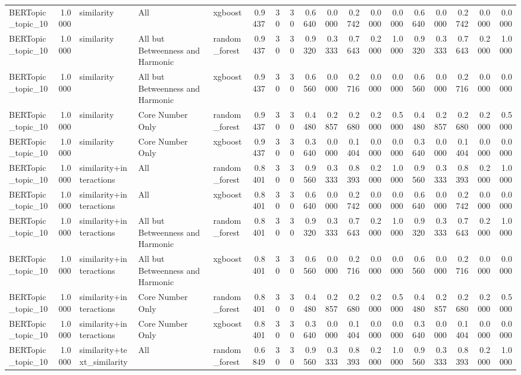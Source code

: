 \begin{tabular}{lrlllrrrrrrrrrrrrr}
BERTopic_topic_10 & 1.0000 & similarity & All & xgboost & 0.9437 & 30 & 30 & 0.6640 & 0.0000 & 0.2742 & 0.0000 & 0.0000 & 0.6640 & 0.0000 & 0.2742 & 0.0000 & 0.0000 \\
BERTopic_topic_10 & 1.0000 & similarity & All but Betweenness and Harmonic & random_forest & 0.9437 & 30 & 30 & 0.9320 & 0.3333 & 0.7643 & 0.2000 & 1.0000 & 0.9320 & 0.3333 & 0.7643 & 0.2000 & 1.0000 \\
BERTopic_topic_10 & 1.0000 & similarity & All but Betweenness and Harmonic & xgboost & 0.9437 & 30 & 30 & 0.6560 & 0.0000 & 0.2716 & 0.0000 & 0.0000 & 0.6560 & 0.0000 & 0.2716 & 0.0000 & 0.0000 \\
BERTopic_topic_10 & 1.0000 & similarity & Core Number Only & random_forest & 0.9437 & 30 & 30 & 0.4480 & 0.2857 & 0.2680 & 0.2000 & 0.5000 & 0.4480 & 0.2857 & 0.2680 & 0.2000 & 0.5000 \\
BERTopic_topic_10 & 1.0000 & similarity & Core Number Only & xgboost & 0.9437 & 30 & 30 & 0.3640 & 0.0000 & 0.1404 & 0.0000 & 0.0000 & 0.3640 & 0.0000 & 0.1404 & 0.0000 & 0.0000 \\
BERTopic_topic_10 & 1.0000 & similarity+interactions & All & random_forest & 0.8401 & 30 & 30 & 0.9560 & 0.3333 & 0.8393 & 0.2000 & 1.0000 & 0.9560 & 0.3333 & 0.8393 & 0.2000 & 1.0000 \\
BERTopic_topic_10 & 1.0000 & similarity+interactions & All & xgboost & 0.8401 & 30 & 30 & 0.6640 & 0.0000 & 0.2742 & 0.0000 & 0.0000 & 0.6640 & 0.0000 & 0.2742 & 0.0000 & 0.0000 \\
BERTopic_topic_10 & 1.0000 & similarity+interactions & All but Betweenness and Harmonic & random_forest & 0.8401 & 30 & 30 & 0.9320 & 0.3333 & 0.7643 & 0.2000 & 1.0000 & 0.9320 & 0.3333 & 0.7643 & 0.2000 & 1.0000 \\
BERTopic_topic_10 & 1.0000 & similarity+interactions & All but Betweenness and Harmonic & xgboost & 0.8401 & 30 & 30 & 0.6560 & 0.0000 & 0.2716 & 0.0000 & 0.0000 & 0.6560 & 0.0000 & 0.2716 & 0.0000 & 0.0000 \\
BERTopic_topic_10 & 1.0000 & similarity+interactions & Core Number Only & random_forest & 0.8401 & 30 & 30 & 0.4480 & 0.2857 & 0.2680 & 0.2000 & 0.5000 & 0.4480 & 0.2857 & 0.2680 & 0.2000 & 0.5000 \\
BERTopic_topic_10 & 1.0000 & similarity+interactions & Core Number Only & xgboost & 0.8401 & 30 & 30 & 0.3640 & 0.0000 & 0.1404 & 0.0000 & 0.0000 & 0.3640 & 0.0000 & 0.1404 & 0.0000 & 0.0000 \\
BERTopic_topic_10 & 1.0000 & similarity+text_similarity & All & random_forest & 0.6849 & 30 & 30 & 0.9560 & 0.3333 & 0.8393 & 0.2000 & 1.0000 & 0.9560 & 0.3333 & 0.8393 & 0.2000 & 1.0000 \\

\end{tabular}
